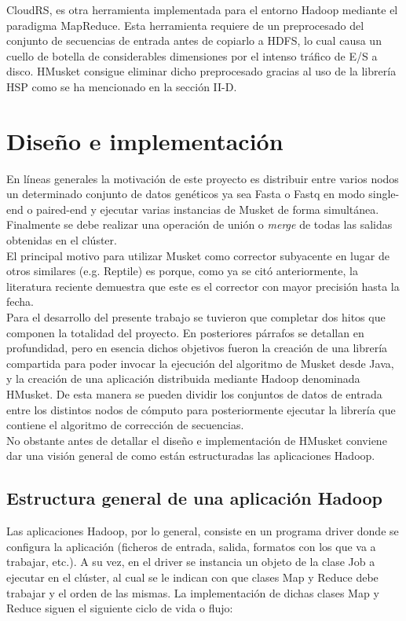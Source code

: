 \documentclass[conference]{IEEEtran}
\begin{document}
CloudRS\cite{cloudrs}, es otra herramienta implementada para el entorno Hadoop mediante el paradigma MapReduce. Esta herramienta requiere de un preprocesado del conjunto de secuencias de entrada antes de copiarlo a HDFS, lo cual causa un cuello de botella de considerables dimensiones por el intenso tráfico de E/S a disco. HMusket consigue eliminar dicho preprocesado gracias al uso de la librería HSP\cite{hsp} como se ha mencionado en la sección II-D.\\

\section{Diseño e implementación}

En líneas generales la motivación de este proyecto es distribuir entre varios nodos un determinado conjunto de datos genéticos ya sea Fasta o Fastq en modo single-end o paired-end y ejecutar varias instancias de Musket de forma simultánea. Finalmente se debe realizar una operación de unión o \textit{merge} de todas las salidas obtenidas en el clúster.\\
El principal motivo para utilizar Musket como corrector subyacente en lugar de otros similares (e.g. Reptile) es porque, como ya se citó anteriormente, la literatura reciente demuestra que este es el corrector con mayor precisión hasta la fecha.\\

Para el desarrollo del presente trabajo se tuvieron que completar dos hitos que componen la totalidad del proyecto. En posteriores párrafos se detallan en profundidad, pero en esencia dichos objetivos fueron la creación de una librería compartida para poder invocar la ejecución del algoritmo de Musket desde Java, y la creación de una aplicación distribuida mediante Hadoop denominada HMusket. De esta manera se pueden dividir los conjuntos de datos de entrada entre los distintos nodos de cómputo para posteriormente ejecutar la librería que contiene el algoritmo de corrección de secuencias.\\

No obstante antes de detallar el diseño e implementación de HMusket conviene dar una visión general de como están estructuradas las aplicaciones Hadoop.

\subsection{Estructura general de una aplicación Hadoop}
Las aplicaciones Hadoop, por lo general, consiste en un programa driver donde se configura la aplicación (ficheros de entrada, salida, formatos con los que va a trabajar, etc.). A su vez, en el driver se instancia un objeto de la clase Job a ejecutar en el clúster, al cual se le indican con que clases Map y Reduce debe trabajar y el orden de las mismas. La implementación de dichas clases Map y Reduce siguen el siguiente ciclo de vida o flujo:
\end{document}
